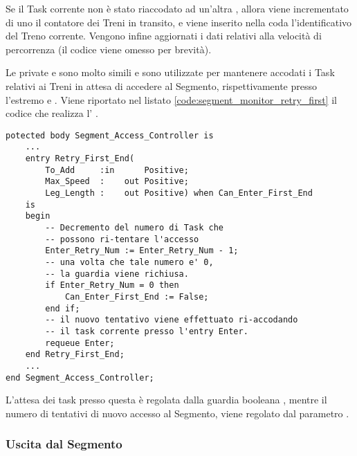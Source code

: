 Se il Task corrente non è stato riaccodato ad un'altra , allora viene incrementato di uno il contatore dei Treni in transito, e viene inserito nella coda  l'identificativo del Treno corrente. Vengono infine aggiornati i dati relativi alla velocità di percorrenza (il codice viene omesso per brevità).

	Le  private  e  sono molto simili e sono utilizzate per mantenere accodati i Task relativi ai Treni in attesa di accedere al Segmento, rispettivamente presso l'estremo  e . Viene riportato nel listato \ref{code:segment_monitor_retry_first} il codice che realizza l' .
	
\begin{lstlisting}[caption=\small{\ii{entry} utilizzata per accodare i Task che rappresentano Treni in attesa di accesso presso il primo estremo del Segmento.},label=code:segment_monitor_retry_first]
potected body Segment_Access_Controller is
	...
	entry Retry_First_End(
		To_Add     :in		Positive;
		Max_Speed  : 	out Positive;
		Leg_Length :	out	Positive) when Can_Enter_First_End
	is
	begin
		-- Decremento del numero di Task che 
		-- possono ri-tentare l'accesso
		Enter_Retry_Num := Enter_Retry_Num - 1;
		-- una volta che tale numero e' 0, 
		-- la guardia viene richiusa.
		if Enter_Retry_Num = 0 then
			Can_Enter_First_End := False;
		end if;
		-- il nuovo tentativo viene effettuato ri-accodando
		-- il task corrente presso l'entry Enter.
		requeue Enter;
	end Retry_First_End;
	...
end Segment_Access_Controller;
\end{lstlisting}
	
	L'attesa dei task presso questa  è regolata dalla guardia booleana , mentre il numero di tentativi di nuovo accesso al Segmento, viene regolato dal parametro .
	
	\subsubsection{Uscita dal Segmento}
	
